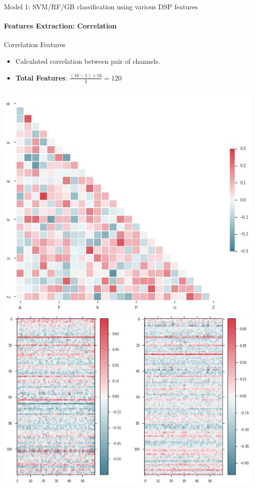 \documentclass{beamer}
\begin{document}
 
\begin{frame}{Model 1: SVM/RF/GB classification using various DSP features}
  \framesubtitle{Features Extraction: Correlation}
 
  \begin{block}{Correlation Features}
    \begin{itemize}

    \item Calculated correlation between pair of channels.
    \item \textbf{Total Features}: $\frac{(16 - 1) \times 16}{2} = 120$
 
    \end{itemize}

  \end{block}

  \begin{columns}
    \includegraphics[scale=0.22]{img/corr1.png}
    \includegraphics[scale=0.22]{img/corr2.png}
  \end{columns}
\end{frame}
\end{document}

